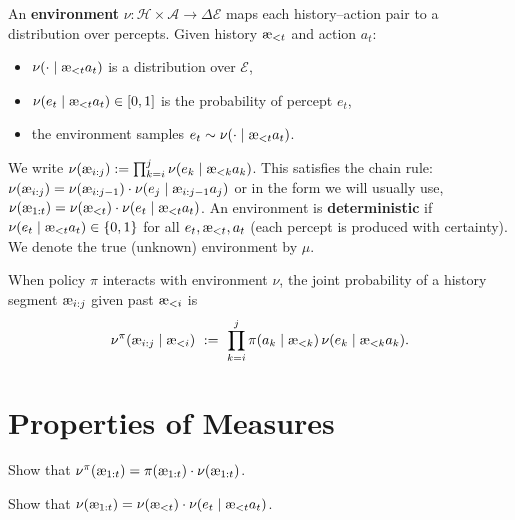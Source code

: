 \documentclass[fontsize=11pt, parskip=half]{scrartcl}
\newcommand{\cA}{\mathcal{A}}
\newcommand{\cE}{\mathcal{E}}
\newcommand{\cH}{\mathcal{H}}
\newcommand{\aes}{\textnormal{\ae}}
\begin{document}
\begin{definition}[Environment $\nu$]\label{def:environment}
An \textbf{environment} $\nu : \cH \times \cA \to \Delta \cE$ maps each history--action pair to a distribution over percepts. Given history $\aes_{<t}$ and action $a_t$:
\begin{itemize}\itemsep=2pt
    \item $\nu(\cdot \mid \aes_{<t} a_t)$ is a distribution over $\cE$,
    \item $\nu(e_t \mid \aes_{<t} a_t) \in [0,1]$ is the probability of percept $e_t$,
    \item the environment samples $e_t \sim \nu(\cdot \mid \aes_{<t} a_t)$.
\end{itemize}
We write $\nu(\aes_{i:j}) := \prod_{k=i}^j \nu(e_k \mid \aes_{<k} a_k)$.
This satisfies the chain rule: $\nu(\aes_{i:j}) = \nu(\aes_{i:j-1}) \cdot \nu(e_j \mid \aes_{i:j-1} a_j)$ or in the form we will usually use, $\nu(\aes_{1:t}) = \nu(\aes_{<t}) \cdot \nu(e_t \mid \aes_{<t} a_t)$.
An environment is \textbf{deterministic} if $\nu(e_t \mid \aes_{<t} a_t) \in \{0,1\}$ for all $e_t, \aes_{<t}, a_t$ (each percept is produced with certainty).
We denote the true (unknown) environment by $\mu$.
\end{definition}

\begin{definition}\label{def:interaction}
When policy $\pi$ interacts with environment $\nu$, the joint probability of a history segment $\aes_{i:j}$ given past $\aes_{<i}$ is
\[
    \nu^\pi(\aes_{i:j} \mid \aes_{<i})
    ~:=~ \prod_{k=i}^j \pi(a_k \mid \aes_{<k})\, \nu(e_k \mid \aes_{<k} a_k).
\]
\end{definition}


\setcounter{section}{-1}
\section{Properties of Measures}\label{prob:measures}

\begin{exercise}[Factorization]
\label{prob:factorization}
Show that $\nu^\pi(\aes_{1:t}) = \pi(\aes_{1:t}) \cdot \nu(\aes_{1:t})$.

\end{exercise}


\begin{exercise}
\label{prob:chain_rule}
Show that $\nu(\aes_{1:t}) = \nu(\aes_{<t}) \cdot \nu(e_t \mid \aes_{<t} a_t)$.

\end{exercise}
\end{document}
